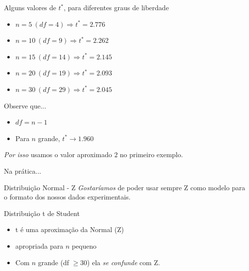 \documentclass{beamer}
\begin{document}
\begin{frame}{Alguns valores de $t^{*}$, para diferentes graus de liberdade}
  \begin{itemize}
  \item $n = 5\ (df = 4) \Rightarrow t^{*} = 2.776$
  \item $n = 10\ (df = 9) \Rightarrow t^{*} = 2.262$
  \item $n = 15\ (df = 14) \Rightarrow t^{*} = 2.145$
  \item $n = 20\ (df = 19) \Rightarrow t^{*} = 2.093$
  \item $n = 30\ (df = 29) \Rightarrow t^{*} = 2.045$
  \end{itemize}
  \begin{block}{Observe que...}
    \begin{itemize}
    \item $df = n - 1$
    \item Para $n$ grande, $t^{*} \rightarrow 1.960$
    \end{itemize}
    {\em Por isso} usamos o valor aproximado $2$ no primeiro exemplo.
  \end{block}
\end{frame}

\begin{frame}{Na prática...}
  \begin{block}{Distribuição Normal - Z}
    \small
    {\em Gostaríamos} de poder usar sempre Z como \alert{modelo} para o formato dos nossos dados experimentais.
  \end{block}
  \begin{block}{Distribuição t de Student}
    \small
    \begin{itemize}
    \item t é uma aproximação da Normal (Z)
    \item apropriada para $n$ pequeno
    \item Com $n$ grande (df $\ge 30$) ela {\em se confunde} com Z.
    \end{itemize}
  \end{block}

\end{frame}
\end{document}
